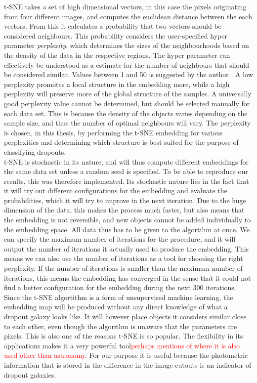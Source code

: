 t-SNE takes a set of high dimensional vectors, in this case the pixels originating from four different images, and computes the euclidean distance between the each vectors. From this it calculates a probability that two vectors should be considered neighbours. This probability considers the user-specified hyper parameter \textit{perplexity}, which determines the sizes of the neighbourhoods based on the density of the data in the respective regions. The hyper parameter can effectively be understood as a estimate for the number of neighbours that should be considered similar. Values between 1 and 50 is suggested by the author \cite{Maaten_2008_tSNE}. A low perplexity promotes a local structure in the embedding more, while a high perplexity will preserve more of the global structure of the samples. A universally good perplexity value cannot be determined, but should be selected manually for each data set. This is because the density of the objects varies depending on the sample size, and thus the number of optimal neighbours will vary. The perplexity is chosen, in this thesis, by performing the t-SNE embedding for various perplexities and determining which structure is best suited for the purpose of classifying dropouts. \\
t-SNE is stochastic in its nature, and will thus compute different embeddings for the same data set unless a random seed is specified. To be able to reproduce our results, this was therefore implemented. Its stochastic nature lies in the fact that it will try out different configurations for the embedding and evaluate the probabilities, which it will try to improve in the next iteration. Due to the huge dimension of the data, this makes the process much faster, but also means that the embedding is not reversible, and new objects cannot be added individually to the embedding space. All data thus has to be given to the algortihm at once. We can specify the maximum number of iterations for the procedure, and it will output the number of iterations it actually used to produce the embedding. This means we can also use the number of iterations as a tool for choosing the right perplexity. If the number of iterations is smaller than the maximum number of iterations, this means the embedding has converged in the sense that it could not find a better configuration for the embedding during the next 300 iterations. \\
Since the t-SNE algortithm is a form of unsupervised machine learning, the embedding map will be produced without any direct knowledge of what a dropout galaxy looks like. It will however place objects it considers similar close to each other, even though the algorithm is unaware that the parameters are pixels. This is also one of the reasons t-SNE is so popular. The flexibility in its applications makes it a very powerful tool\textcolor{red}{perhaps mentions of where it is also used other than astronomy}. For our purpose it is useful because the photometric information that is stored in the difference in the image cutouts is an indicator of dropout galaxies.

